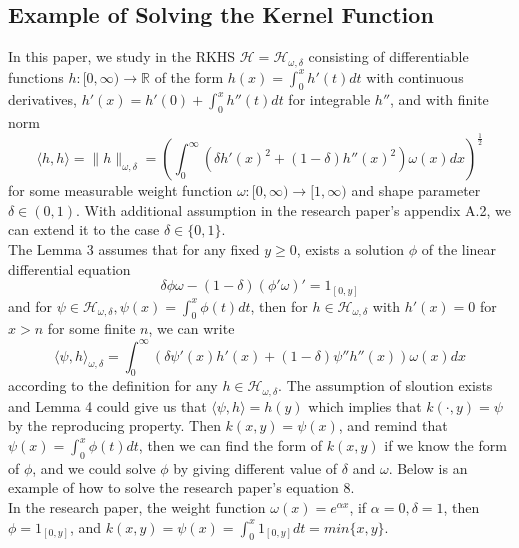 \subsection{Example of Solving the Kernel Function}
In this paper, we study in the RKHS $\mathcal{H} = \mathcal{H}_{\omega ,\delta}$ consisting of differentiable functions $ h : [0, \infty ) \to \mathbb{R}$ of the form $h(x) = \int_{0}^{x} h'(t) dt$ with continuous derivatives, $h'(x) = h'(0) + \int_{0}^{x} h''(t)dt $ for integrable $h''$, and with finite norm 
\begin{equation}
\langle h, h\rangle = \parallel h \parallel_{\omega ,\delta} = (\int_{0}^{\infty} (\delta h'(x)^2 + (1 - \delta)h''(x)^2)\omega (x)dx)^{\frac{1}{2}}
\end{equation}
for some measurable weight function $\omega : [0, \infty) \to [1, \infty)$ and shape parameter $\delta \in (0,1)$. With additional assumption in the research paper's appendix A.2, we can extend it to the case $\delta \in \{ 0, 1\}$. \\
The Lemma 3 assumes that for any fixed $y \ge 0$, exists a solution $\phi$ of the linear differential equation 
\begin{equation}
\delta \phi \omega - (1-\delta )(\phi ' \omega)' = 1_{[0,y]}
\end{equation}
and for $\psi  \in \mathcal{H}_{\omega, \delta}, \psi (x) = \int_{0}^{x} \phi (t)dt$, then for $h \in \mathcal{H}_{\omega, \delta}$ with $h'(x) = 0$ for $x > n$ for some finite $n$, we can write 
\begin{equation}
\langle \psi , h\rangle_{\omega, \delta} = \int_{0}^{\infty} (\delta \psi '(x) h'(x) + (1-\delta )\psi '' h''(x))\omega (x)dx
\end{equation}
according to the definition for any $h \in \mathcal{H}_{\omega,\delta}$. The assumption of sloution exists and Lemma 4 could give us that $\langle \psi , h\rangle = h(y)$ which implies that $k(\cdot , y) = \psi$ by the reproducing property. Then  $k(x , y) = \psi (x)$, and remind that $\psi (x) = \int_{0}^{x} \phi (t)dt$, then we can find the form of $k(x,y)$ if we know the form of $\phi$, and we could solve $\phi$ by giving different value of $\delta$ and $\omega$. Below is an example of how to solve the research paper's equation 8. \\
In the research paper, the weight function $\omega (x) = e^{\alpha x}$, if $\alpha = 0, \delta = 1$, then $ \phi = 1_{[0,y]}$, and $k(x,y) = \psi (x) = \int_{0}^{x} 1_{[0,y]} dt = min\{x, y\}$. 
